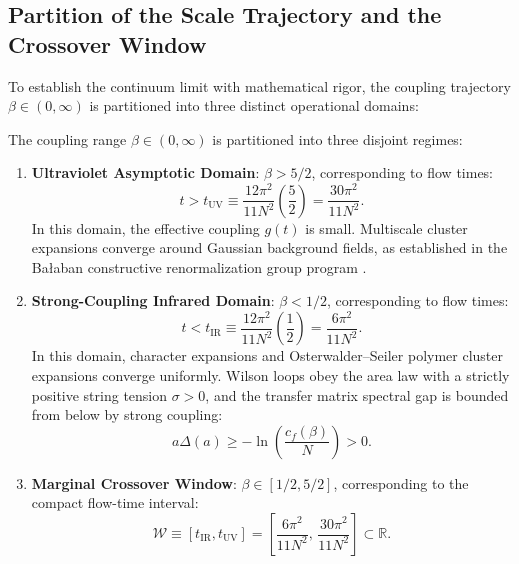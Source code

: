 \subsection{Partition of the Scale Trajectory and the Crossover Window}
\label{subsec:scale_partition}

To establish the continuum limit with mathematical rigor, the coupling trajectory $\beta \in (0, \infty)$ is partitioned into three distinct operational domains:

\begin{definition}
\label{def:trajectory_partition}
The coupling range $\beta \in (0, \infty)$ is partitioned into three disjoint regimes:
\begin{enumerate}
    \item \textbf{Ultraviolet Asymptotic Domain}: $\beta > 5/2$, corresponding to flow times:
    \begin{equation}
    t > t_{\mathrm{UV}} \equiv \frac{12\pi^2}{11 N^2} \left( \frac{5}{2} \right) = \frac{30\pi^2}{11 N^2}.
    \end{equation}
    In this domain, the effective coupling $g(t)$ is small. Multiscale cluster expansions converge around Gaussian background fields, as established in the Bałaban constructive renormalization group program \cite{Balaban1984,Balaban1985,Balaban1987,Balaban1988}.
    
    \item \textbf{Strong-Coupling Infrared Domain}: $\beta < 1/2$, corresponding to flow times:
    \begin{equation}
    t < t_{\mathrm{IR}} \equiv \frac{12\pi^2}{11 N^2} \left( \frac{1}{2} \right) = \frac{6\pi^2}{11 N^2}.
    \end{equation}
    In this domain, character expansions and Osterwalder--Seiler polymer cluster expansions converge uniformly. Wilson loops obey the area law with a strictly positive string tension $\sigma > 0$, and the transfer matrix spectral gap is bounded from below by strong coupling:
    \begin{equation}
    a \Delta(a) \ge -\ln\left( \frac{c_f(\beta)}{N} \right) > 0.
    \end{equation}
    
    \item \textbf{Marginal Crossover Window}: $\beta \in [1/2, 5/2]$, corresponding to the compact flow-time interval:
    \begin{equation}
    \label{eq:crossover_window_def}
    \mathcal{W} \equiv [t_{\mathrm{IR}}, t_{\mathrm{UV}}] = \left[ \frac{6\pi^2}{11 N^2}, \, \frac{30\pi^2}{11 N^2} \right] \subset \mathbb{R}.
    \end{equation}
\end{enumerate}
\end{definition}

